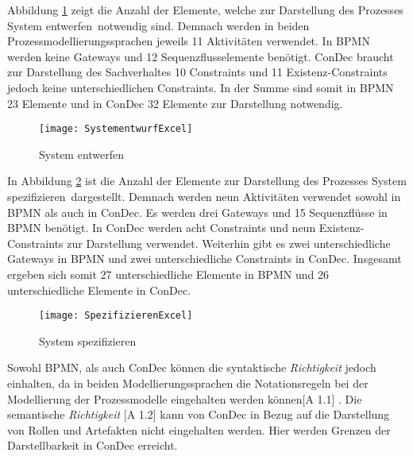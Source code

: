 {Abbildung \ref{fig:SystementwurfExcel} zeigt die Anzahl der Elemente, welche zur Darstellung des Prozesses \grqq System entwerfen\grqq \ notwendig sind. Demnach werden in beiden Prozessmodellierungssprachen jeweils 11 Aktivitäten verwendet. In BPMN werden keine Gateways und 12 Sequenzflusselemente benötigt. ConDec braucht zur Darstellung des Sachverhaltes 10 Constraints und 11 Existenz-Constraints jedoch keine unterschiedlichen Constraints. In der Summe sind somit in BPMN 23 Elemente und in ConDec 32 Elemente zur Darstellung notwendig.\newline

\begin{figure}[!htbp]
\begin{center}
  \texttt{[image: SystementwurfExcel]} %
  \caption{System entwerfen}
  \label{fig:SystementwurfExcel}
\end{center}
\end{figure}

In Abbildung \ref{fig:SpezifizierenExcel} ist die Anzahl der Elemente zur Darstellung des Prozesses \grqq System spezifizieren\grqq \ dargestellt. Demnach werden neun Aktivitäten verwendet sowohl in BPMN als auch in ConDec. Es werden drei Gateways und 15 Sequenzflüsse in BPMN benötigt. In ConDec werden acht Constraints und neun Existenz-Constraints zur Darstellung verwendet. Weiterhin gibt es zwei unterschiedliche Gateways in BPMN und zwei unterschiedliche Constraints in ConDec. Insgesamt ergeben sich somit 27 unterschiedliche Elemente in BPMN und 26 unterschiedliche Elemente in ConDec. \newline

\begin{figure}[!htbp]
\begin{center}
  \texttt{[image: SpezifizierenExcel]} %
  \caption{System spezifizieren}
  \label{fig:SpezifizierenExcel}
\end{center}
\end{figure}

Sowohl BPMN, als auch ConDec können die syntaktische \textit{Richtigkeit} jedoch einhalten, da in beiden Modellierungssprachen die Notationsregeln bei der Modellierung der Prozessmodelle eingehalten werden können[A 1.1] .\newline
Die semantische \textit{Richtigkeit} [A 1.2] kann von ConDec in Bezug auf die Darstellung von Rollen und Artefakten nicht eingehalten werden. Hier werden Grenzen der Darstellbarkeit in ConDec erreicht.\newline

}
